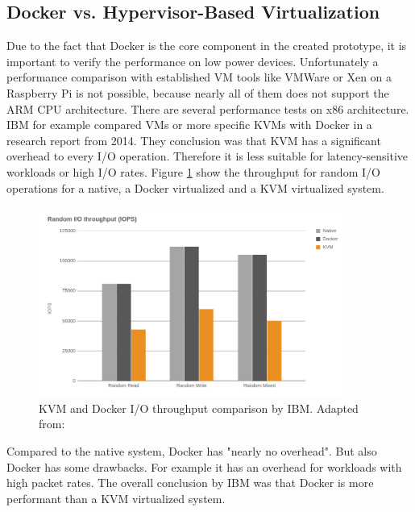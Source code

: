 \subsection{Docker vs. Hypervisor-Based Virtualization}
Due to the fact that Docker is the core component in the created prototype, it is important to verify the performance on low power devices.
Unfortunately a performance comparison with established \ac{VM} tools like VMWare or Xen on a Raspberry Pi is not possible, because nearly all of them does not support the ARM \ac{CPU} architecture.
There are several performance tests on x86 architecture.
IBM for example compared \acp{VM} or more specific \acp{KVM} with Docker in a research report\autocite{IBM:Performance:2014} from 2014.
They conclusion was that \ac{KVM} has a significant overhead to every I/O operation.
Therefore it is less suitable for latency-sensitive workloads or high I/O rates.
Figure \ref{fig:ibm_kvm_docker_io} show the throughput for random I/O operations for a native, a Docker virtualized and a \ac{KVM} virtualized system.

\begin{figure}[H]
    \centering
    \includegraphics[width=0.9\textwidth]{resources/images/performance_ibm_kvm_docker_io.png}
    \caption[KVM and Docker I/O throughput comparison by IBM]{KVM and Docker I/O throughput comparison by IBM. Adapted from: \autocite[p. 6]{IBM:Performance:2014}}
    \label{fig:ibm_kvm_docker_io}
\end{figure}

Compared to the native system, Docker has "nearly no overhead"\autocite[p. 6]{IBM:Performance:2014}.
But also Docker has some drawbacks.
For example it has an overhead for workloads with high packet rates.\autocite[cf.][p. 6]{IBM:Performance:2014}
The overall conclusion by IBM was that Docker is more performant than a \ac{KVM} virtualized system.\newline

